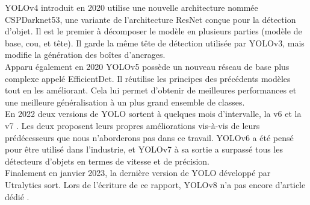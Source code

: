 YOLOv4 introduit en 2020 \cite{bochkovskiy_yolov4_2020} utilise une nouvelle architecture nommée CSPDarknet53, une variante de l'architecture ResNet conçue pour la détection d'objet. Il est le premier à décomposer le modèle en plusieurs parties (modèle de base, cou, et tête). Il garde la même tête de détection utilisée par YOLOv3, mais modifie la génération des boîtes d'ancrages.\\

Apparu également en 2020 YOLOv5 \cite{jocher_yolov5_2020} possède un nouveau réseau de base plus complexe appelé EfficientDet. Il réutilise les principes des précédents modèles tout en les améliorant. Cela lui permet d'obtenir de meilleures performances et une meilleure généralisation à un plus grand ensemble de classes.\\

En 2022 deux versions de YOLO sortent à quelques mois d'intervalle, la v6 \cite{li_yolov6_2022} et la v7 \cite{wang_yolov7_2022}. Les deux proposent leurs propres améliorations vis-à-vis de leurs prédécesseurs que nous n'aborderons pas dans ce travail. YOLOv6 a été pensé pour être utilisé dans l'industrie, et YOLOv7 à sa sortie a surpassé tous les détecteurs d'objets en termes de vitesse et de précision.\\

Finalement en janvier 2023, la dernière version de YOLO développé par Utralytics sort. Lors de l'écriture de ce rapport, YOLOv8 n'a pas encore d'article dédié \cite{jocher_ultralytics_2023}. 

